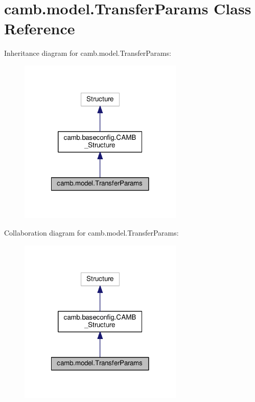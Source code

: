 \hypertarget{classcamb_1_1model_1_1TransferParams}{}\section{camb.\+model.\+Transfer\+Params Class Reference}
\label{classcamb_1_1model_1_1TransferParams}


Inheritance diagram for camb.\+model.\+Transfer\+Params\+:
\nopagebreak
\begin{figure}[H]
\begin{center}
\leavevmode
\includegraphics[width=222pt]{classcamb_1_1model_1_1TransferParams__inherit__graph}
\end{center}
\end{figure}


Collaboration diagram for camb.\+model.\+Transfer\+Params\+:
\nopagebreak
\begin{figure}[H]
\begin{center}
\leavevmode
\includegraphics[width=222pt]{classcamb_1_1model_1_1TransferParams__coll__graph}
\end{center}
\end{figure}
